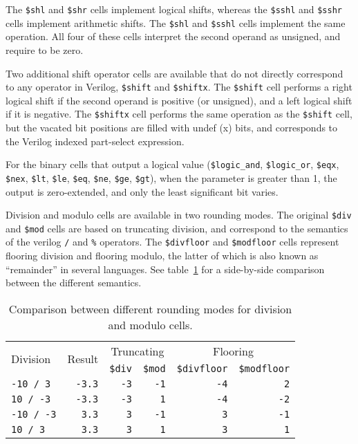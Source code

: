 The {\tt \$shl} and {\tt \$shr} cells implement logical shifts, whereas the {\tt \$sshl} and
{\tt \$sshr} cells implement arithmetic shifts. The {\tt \$shl} and {\tt \$sshl} cells implement
the same operation. All four of these cells interpret the second operand as unsigned, and require
 to be zero.

Two additional shift operator cells are available that do not directly correspond to any operator
in Verilog, {\tt \$shift} and {\tt \$shiftx}. The {\tt \$shift} cell performs a right logical shift
if the second operand is positive (or unsigned), and a left logical shift if it is negative.
The {\tt \$shiftx} cell performs the same operation as the {\tt \$shift} cell, but the vacated bit
positions are filled with undef (x) bits, and corresponds to the Verilog indexed part-select expression.

For the binary cells that output a logical value ({\tt \$logic\_and}, {\tt \$logic\_or},
{\tt \$eqx}, {\tt \$nex}, {\tt \$lt}, {\tt \$le}, {\tt \$eq}, {\tt \$ne}, {\tt \$ge},
{\tt \$gt}), when the  parameter is greater than 1, the output is zero-extended,
and only the least significant bit varies.

Division and modulo cells are available in two rounding modes. The original {\tt \$div} and {\tt \$mod}
cells are based on truncating division, and correspond to the semantics of the verilog {\tt /} and
{\tt \%} operators. The {\tt \$divfloor} and {\tt \$modfloor} cells represent flooring division and
flooring modulo, the latter of which is also known as ``remainder'' in several languages. See
table~\ref{tab:CellLib_divmod} for a side-by-side comparison between the different semantics.

\begin{table}[h]
\hfil
\begin{tabular}{lr|rr|rr}
\multirow{2}{*}{Division} & \multirow{2}{*}{Result} & \multicolumn{2}{c|}{Truncating} & \multicolumn{2}{c}{Flooring} \\
               &            & {\tt \$div} & {\tt \$mod} & {\tt \$divfloor} & {\tt \$modfloor} \\
\hline
{\tt -10 / 3}  & {\tt -3.3} & {\tt -3}    & {\tt -1}    & {\tt -4}         & {\tt 2} \\
{\tt 10 / -3}  & {\tt -3.3} & {\tt -3}    & {\tt 1}     & {\tt -4}         & {\tt -2} \\
{\tt -10 / -3} & {\tt 3.3}  & {\tt 3}     & {\tt -1}    & {\tt 3}          & {\tt -1} \\
{\tt 10 / 3}   & {\tt 3.3}  & {\tt 3}     & {\tt 1}     & {\tt 3}          & {\tt 1} \\
\end{tabular}
\caption{Comparison between different rounding modes for division and modulo cells.}
\label{tab:CellLib_divmod}
\end{table}

